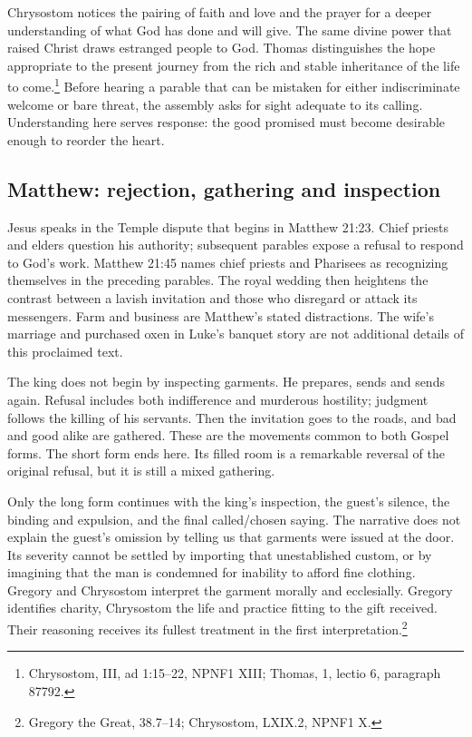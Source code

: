 Chrysostom notices the pairing of faith and love and the prayer for a deeper understanding of what God has done and will give. The same divine power that raised Christ draws estranged people to God. Thomas distinguishes the hope appropriate to the present journey from the rich and stable inheritance of the life to come.\footnote{Chrysostom,  III, ad 1:15--22, NPNF1 XIII; Thomas,  1, lectio 6, paragraph 87792.} Before hearing a parable that can be mistaken for either indiscriminate welcome or bare threat, the assembly asks for sight adequate to its calling. Understanding here serves response: the good promised must become desirable enough to reorder the heart.

\subsection{Matthew: rejection, gathering and inspection}
Jesus speaks in the Temple dispute that begins in Matthew 21:23. Chief priests and elders question his authority; subsequent parables expose a refusal to respond to God's work. Matthew 21:45 names chief priests and Pharisees as recognizing themselves in the preceding parables. The royal wedding then heightens the contrast between a lavish invitation and those who disregard or attack its messengers. Farm and business are Matthew's stated distractions. The wife's marriage and purchased oxen in Luke's banquet story are not additional details of this proclaimed text.

The king does not begin by inspecting garments. He prepares, sends and sends again. Refusal includes both indifference and murderous hostility; judgment follows the killing of his servants. Then the invitation goes to the roads, and bad and good alike are gathered. These are the movements common to both Gospel forms. The short form ends here. Its filled room is a remarkable reversal of the original refusal, but it is still a mixed gathering.

Only the long form continues with the king's inspection, the guest's silence, the binding and expulsion, and the final called/chosen saying. The narrative does not explain the guest's omission by telling us that garments were issued at the door. Its severity cannot be settled by importing that unestablished custom, or by imagining that the man is condemned for inability to afford fine clothing. Gregory and Chrysostom interpret the garment morally and ecclesially. Gregory identifies charity, Chrysostom the life and practice fitting to the gift received. Their reasoning receives its fullest treatment in the first interpretation.\footnote{Gregory the Great,  38.7--14; Chrysostom,  LXIX.2, NPNF1 X.}

